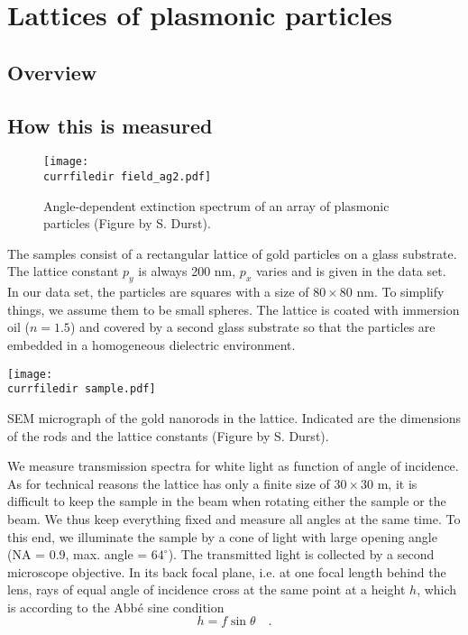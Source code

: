 \renewcommand{\lastmod}{November 18, 2021}
\renewcommand{\chapterauthors}{Markus Lippitz}


\chapter{Lattices of plasmonic particles}

\section{Overview}



\section{How this is  measured}

\begin{figure}
\texttt{[image: \\currfiledir field\_ag2.pdf]}
\caption{Angle-dependent extinction spectrum of an array of plasmonic particles (Figure by S. Durst). \label{fig:8_intro} }
\end{figure}



The samples consist of a rectangular lattice of gold particles on a glass substrate. The lattice constant $p_y$ is always 200 nm, $p_x$ varies and is given in the data set. In our data set, the particles are squares with a size of $ 80 \times 80$ nm. To simplify things, we assume them to be small spheres. The lattice is coated with immersion oil ($n=1.5$) and covered by a second glass substrate so that the particles are embedded in a homogeneous dielectric environment.

\begin{marginfigure}
\texttt{[image: \\currfiledir sample.pdf]}
\caption{SEM micrograph of the gold nanorods in the lattice. Indicated are the dimensions of the rods and the lattice constants (Figure by S. Durst).}
\end{marginfigure}

We measure transmission spectra for white light as function of angle of incidence. As for technical reasons the lattice has only a finite size of $30 \times 30$ \textmu m, it is difficult to keep the sample in the beam when rotating either the sample or the beam. We thus keep everything fixed and measure all angles at the same time. To this end, we illuminate the sample by a cone of light with large opening angle (NA = 0.9, max. angle = $64^\circ$). The transmitted light is collected by a second microscope objective. In its back focal plane, i.e. at one focal length behind the lens, rays of equal angle of incidence cross at the same point at a height $h$, which is according to the Abbé sine condition
\begin{equation}
 h = f \sin \theta \quad .
\end{equation}

